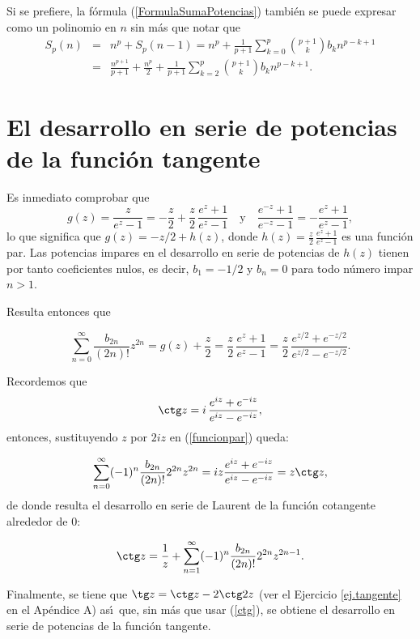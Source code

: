 \begin{remark*} Si se prefiere, la f\'ormula (\ref{FormulaSumaPotencias}) tambi\'en se puede expresar como un polinomio en $n$ sin m\'as que notar que
\begin{eqnarray*}S_p(n)&=&n^p+S_p(n-1)=n^p+\frac{1}{p+1}\sum_{k=0}^p{p+1\choose k}b_kn^{p-k+1}\\ &=&
\frac{n^{p+1}}{p+1}+\frac{n^p}{2}+\frac{1}{p+1}\sum_{k=2}^p{p+1\choose k}b_kn^{p-k+1}.\end{eqnarray*}
\end{remark*}

\section{El desarrollo en serie de potencias de la funci\'on tangente}

Es inmediato comprobar que
$$
g(z)=\frac{z}{e^z-1}=-\frac{z}{2}+\frac{z}{2}\,\frac{e^z+1}{e^z-1} \quad\text{y}\quad
\frac{e^{-z}+1}{e^{-z}-1}=-\frac{e^z+1}{e^z-1},$$
lo que significa que $g(z)=-z/2+h(z)$, donde $\displaystyle h(z)=\frac{z}{2}\,\frac{e^z+1}{e^z-1}$ es una funci\'on par. Las potencias impares en el desarrollo en serie de potencias de $h(z)$ tienen por  tanto coeficientes nulos, es decir, $b_1=-1/2$ y $b_n=0$ para todo n\'umero impar $n>1$.

Resulta entonces que

\begin{equation}\label{funcionpar}\sum_{n=0}^\infty\frac{b_{2n}}{(2n)!}z^{2n}=g(z)+\frac{z}{2}=
\frac{z}{2}\,\frac{e^z+1}{e^z-1}=\frac{z}{2}\,\frac{e^{z/2}+e^{-z/2}}{e^{z/2}-e^{-z/2}}.
\end{equation}

Recordemos que
$$\ctg z=i\,\frac{e^{iz}+e^{-iz}}{e^{iz}-e^{-iz}},$$
entonces, sustituyendo $z$ por $2iz$ en (\ref{funcionpar}) queda:

$$\sum_{n=0}^\infty (-1)^n\frac{b_{2n}}{(2n)!}2^{2n}z^{2n}=iz\frac{e^{iz}+e^{-iz}}{e^{iz}-e^{-iz}}=z\ctg z,$$
de donde resulta el desarrollo en serie de Laurent de la funci\'on cotangente alrededor de $0$:

\begin{equation}\label{ctg}\ctg z=\frac{1}{z}+\sum_{n=1}^\infty (-1)^n\frac{b_{2n}}{(2n)!}2^{2n}z^{2n-1}.
\end{equation}

Finalmente, se tiene que $\tg z=\ctg z-2\ctg 2z$ (ver el Ejercicio \ref{ej.tangente} en el Ap\'endice A)  as\'\i\ que, sin m\'as que usar (\ref{ctg}), se obtiene el desarrollo en serie de potencias de la funci\'on tangente.

